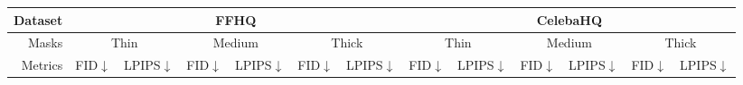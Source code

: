 \begin{table}[t]
  \hspace{-1cm}
  \scriptsize
  \begin{tabular}{|l|c|c|c|c|c|c|c|c|c|c|c|c|}
  \hline
  \multicolumn{1}{|r|}{Dataset} &
    \multicolumn{6}{c|}{FFHQ} &
    \multicolumn{6}{c|}{CelebaHQ} \\ \hline
  \multicolumn{1}{|r|}{Masks} &
    \multicolumn{2}{c|}{Thin} &
    \multicolumn{2}{c|}{Medium} &
    \multicolumn{2}{c|}{Thick} &
    \multicolumn{2}{c|}{Thin} &
    \multicolumn{2}{c|}{Medium} &
    \multicolumn{2}{c|}{Thick} \\ \hline
  
  \multicolumn{1}{|r|}{Metrics} &
    \multicolumn{1}{c|}{FID$\downarrow$} &
    \multicolumn{1}{c|}{LPIPS$\downarrow$} &
    \multicolumn{1}{c|}{FID$\downarrow$} &
    \multicolumn{1}{c|}{LPIPS$\downarrow$} &
    \multicolumn{1}{c|}{FID$\downarrow$} &
    \multicolumn{1}{c|}{LPIPS$\downarrow$} &
    \multicolumn{1}{c|}{FID$\downarrow$} &
    \multicolumn{1}{c|}{LPIPS$\downarrow$} &
    \multicolumn{1}{c|}{FID$\downarrow$} &
    \multicolumn{1}{c|}{LPIPS$\downarrow$} &
    \multicolumn{1}{c|}{FID$\downarrow$} &
    \multicolumn{1}{c|}{LPIPS$\downarrow$}  \\ \hline
  

\end{tabular}
\end{table}
